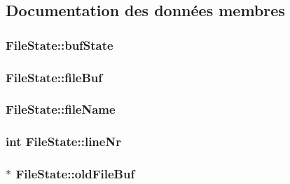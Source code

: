 \subsection{Documentation des données membres}
\hypertarget{struct_file_state_a1b18cdf1dfc9a5d436c69bb18062bc19}{}
\subsubsection[{buf\+State}]{ File\+State\+::buf\+State}\label{struct_file_state_a1b18cdf1dfc9a5d436c69bb18062bc19}
\hypertarget{struct_file_state_ad3bde327c92032a6ea108d5b6b82cb0f}{}
\subsubsection[{file\+Buf}]{ File\+State\+::file\+Buf}\label{struct_file_state_ad3bde327c92032a6ea108d5b6b82cb0f}
\hypertarget{struct_file_state_a3854d7f199d9ca0a7ca88d6cc2add008}{}
\subsubsection[{file\+Name}]{ File\+State\+::file\+Name}\label{struct_file_state_a3854d7f199d9ca0a7ca88d6cc2add008}
\hypertarget{struct_file_state_a249445ca799ace1fa1ba438369273e04}{}
\subsubsection[{line\+Nr}]{\setlength{\rightskip}{0pt plus 5cm}int File\+State\+::line\+Nr}\label{struct_file_state_a249445ca799ace1fa1ba438369273e04}
\hypertarget{struct_file_state_a1f4e8240ac9abda5299998f9db17f96a}{}
\subsubsection[{old\+File\+Buf}]{$\ast$ File\+State\+::old\+File\+Buf}\label{struct_file_state_a1f4e8240ac9abda5299998f9db17f96a}
\hypertarget{struct_file_state_adcbdee9d4290766ae74a8d79115040b6}{}
